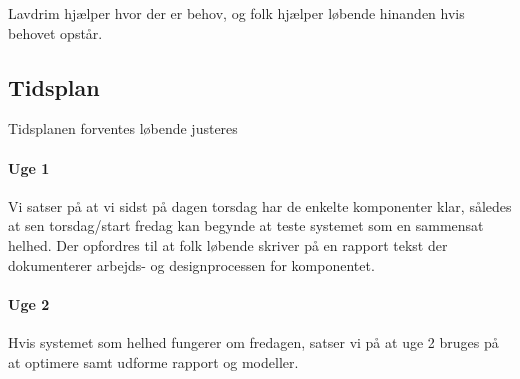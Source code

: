 \documentclass[a4paper]{article}
\begin{document}
Lavdrim hjælper hvor der er behov, og folk hjælper løbende hinanden hvis behovet opstår.


\subsection{Tidsplan} %
\label{sub:Tidsplan}

Tidsplanen forventes løbende justeres

\paragraph{Uge 1} %
\label{par:Uge 1}

Vi satser på at vi sidst på dagen torsdag har de enkelte komponenter klar, således at sen torsdag/start fredag kan begynde at teste systemet som en sammensat helhed. Der opfordres til at folk løbende skriver på en rapport tekst der dokumenterer arbejds- og designprocessen for komponentet.


\paragraph{Uge 2} %
\label{par:Uge 2}

Hvis systemet som helhed fungerer om fredagen, satser vi på at uge 2 bruges på at optimere samt udforme rapport og modeller. 



\end{document}
